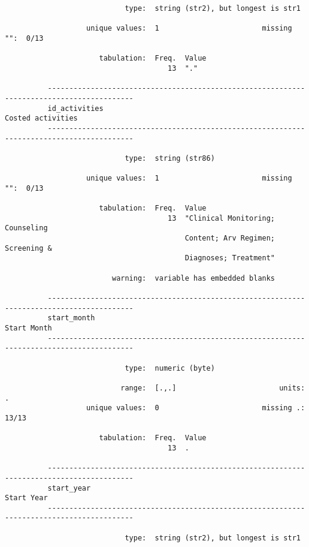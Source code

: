 \documentclass{article}
\begin{document}
\begin{verbatim}
                            type:  string (str2), but longest is str1
          
                   unique values:  1                        missing "":  0/13
          
                      tabulation:  Freq.  Value
                                      13  "."
          
          ------------------------------------------------------------------------------------------
          id_activities                                                            Costed activities
          ------------------------------------------------------------------------------------------
          
                            type:  string (str86)
          
                   unique values:  1                        missing "":  0/13
          
                      tabulation:  Freq.  Value
                                      13  "Clinical Monitoring; Counseling
                                          Content; Arv Regimen; Screening &
                                          Diagnoses; Treatment"
          
                         warning:  variable has embedded blanks
          
          ------------------------------------------------------------------------------------------
          start_month                                                                    Start Month
          ------------------------------------------------------------------------------------------
          
                            type:  numeric (byte)
          
                           range:  [.,.]                        units:  .
                   unique values:  0                        missing .:  13/13
          
                      tabulation:  Freq.  Value
                                      13  .
          
          ------------------------------------------------------------------------------------------
          start_year                                                                      Start Year
          ------------------------------------------------------------------------------------------
          
                            type:  string (str2), but longest is str1
          

\end{verbatim}
\end{document}

